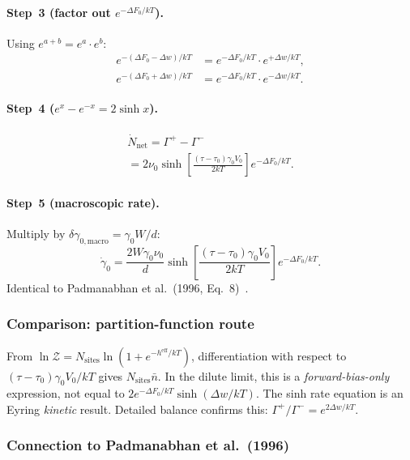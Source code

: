 \documentclass[5p,sort&compress]{elsarticle}
\newcommand{\dF}{\Delta F_0}
\newcommand{\gz}{\gamma_0}
\begin{document}
\paragraph{Step~3 (factor out $e^{-\dF/kT}$).}
Using $e^{a+b}=e^a\cdot e^b$:
\begin{align*}
  e^{-(\dF-\Delta w)/kT}&=e^{-\dF/kT}\cdot e^{+\Delta w/kT},\\
  e^{-(\dF+\Delta w)/kT}&=e^{-\dF/kT}\cdot e^{-\Delta w/kT}.
\end{align*}

\paragraph{Step~4 ($e^x-e^{-x}=2\sinh x$).}
\begin{multline}
  \dot N_\text{net}=\Gamma^+-\Gamma^-\\
  =2\nu_0\sinh\!\left[\frac{(\tau-\tau_0)\gz V_0}{2kT}\right]
  e^{-\dF/kT}.
  \label{eq:Nnet}
\end{multline}

\paragraph{Step~5 (macroscopic rate).}
Multiply by $\delta\gamma_{0,\text{macro}}=\gz W/d$:
\begin{equation}
  \boxed{\dot\gz=\frac{2W\gz\nu_0}{d}
  \sinh\!\left[\frac{(\tau-\tau_0)\gz V_0}{2kT}\right]
  e^{-\dF/kT}.}
  \label{eq:rate}
\end{equation}
Identical to Padmanabhan et al.\ (1996, Eq.~8)~\cite{pad-part1}.

\subsubsection{Comparison: partition-function route}

From $\ln\mathcal Z=N_\text{sites}\ln(1+e^{-h^\text{eff}/kT})$,
differentiation with respect to $(\tau-\tau_0)\gz V_0/kT$ gives
$N_\text{sites}\bar n$. In the dilute limit, this is a
\emph{forward-bias-only} expression, not equal to $2e^{-\dF/kT}
\sinh(\Delta w/kT)$.
The sinh rate equation is an Eyring \emph{kinetic} result.
Detailed balance confirms this: $\Gamma^+/\Gamma^-=e^{2\Delta w/kT}$.

\subsubsection{Connection to Padmanabhan et al.\ (1996)}
\end{document}
